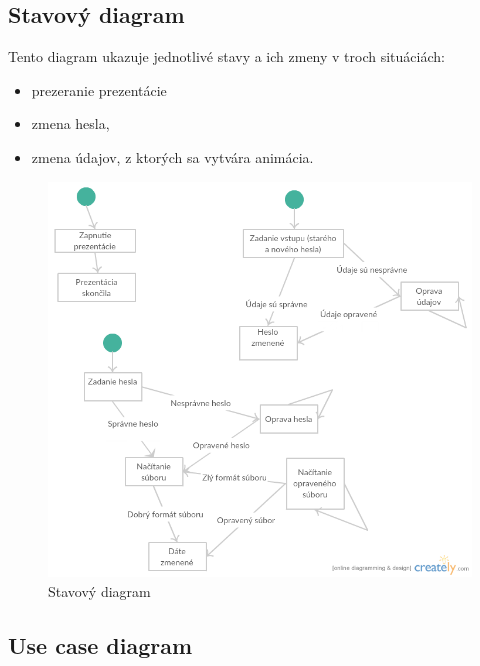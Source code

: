 \documentclass[12pt,a4paper]{report}
\begin{document}
\subsection[Stavový diagram]{\rmfamily\bfseries
	Stavový diagram}
Tento diagram ukazuje jednotlivé stavy a ich zmeny v troch situáciách:
\begin{itemize}
	\item prezeranie prezentácie
	\item zmena hesla,
	\item zmena údajov, z ktorých sa vytvára animácia.
\end{itemize}
\begin{figure}[htb]
	\centering
	\includegraphics[scale=0.5]{Stavovy_diagram}
	\caption{Stavový diagram}
	\label{fig:Stavový diagram}
\end{figure}
\FloatBarrier
\clearpage
\subsection[Use case diagram]{\rmfamily\bfseries
	Use case diagram}
\end{document}
